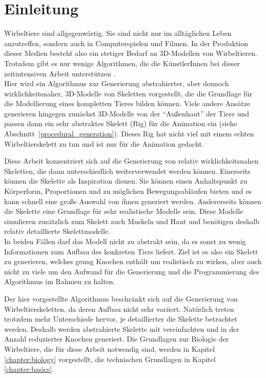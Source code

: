 \chapter{Einleitung}

Wirbeltiere sind allgegenwärtig. Sie sind nicht nur im alltäglichen Leben anzutreffen, sondern auch in Computerspielen und Filmen. In der Produktion dieser Medien besteht also ein stetiger Bedarf an 3D-Modellen von Wirbeltieren.
Trotzdem gibt es nur wenige Algorithmen, die die KünstlerInnen bei dieser zeitintensiven Arbeit unterstützen \cite{PCGSurvey_videoGames}.\\
Hier wird ein Algorithmus zur Generierung abstrahierter, aber dennoch wirklichkeitsnaher, 3D-Modelle von Skeletten vorgestellt, die die Grundlage für die Modellierung eines kompletten Tieres bilden können.
Viele andere Ansätze generieren hingegen zunächst 3D-Modelle von der "`Außenhaut"' der Tiere und passen dann ein sehr abstraktes Skelett (Rig) für die Animation ein (siehe \mbox{Abschnitt \ref{procedural_generation}}). 
Dieses Rig hat nicht viel mit einem echten Wirbeltierskelett zu tun und ist nur für die Animation gedacht.

Diese Arbeit konzentriert sich auf die Generierung von relativ wirklichkeitsnahen Skeletten, die dann unterschiedlich weiterverwendet werden können.
Einerseits können die Skelette als Inspiration dienen. Sie können einen Anhaltspunkt zu Körperform, Proportionen und zu möglichen Bewegungsabläufen bieten und es kann schnell eine große Auswahl von ihnen generiert werden.
Andererseits können die Skelette eine Grundlage für sehr realistische Modelle sein. Diese Modelle simulieren zusätzlich zum Skelett auch Muskeln und Haut und benötigen deshalb relativ detaillierte Skelettmodelle. \\
In beiden Fällen darf das Modell nicht zu abstrakt sein, da es sonst zu wenig Informationen zum Aufbau des konkreten Tiers liefert.
Ziel ist es also ein Skelett zu generieren, welches genug Knochen enthält um realistisch zu wirken, aber auch nicht zu viele um den Aufwand für die Generierung und die Programmierung des Algorithmus im Rahmen zu halten.

Der hier vorgestellte Algorithmus beschränkt sich auf die Generierung von Wirbeltierskeletten, da deren Aufbau nicht sehr variiert. Natürlich treten trotzdem mehr Unterschiede hervor, je detaillierter die Skelette betrachtet werden.
Deshalb werden abstrahierte Skelette mit vereinfachten und in der Anzahl reduzierter Knochen generiert. Die Grundlagen zur Biologie der Wirbeltiere, die für diese Arbeit notwendig sind, werden in Kapitel \ref{chapter:biology} vorgestellt, die technischen Grundlagen in Kapitel \ref{chapter:basics}.

